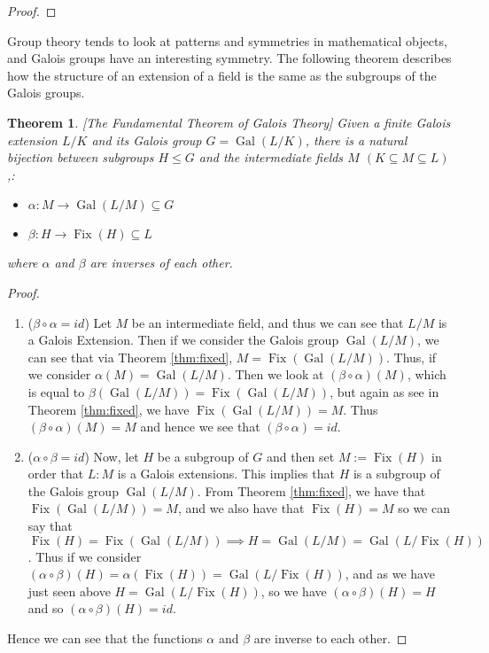 \documentclass[12pt]{article}
\newtheorem{theorem}{Theorem}
\newcommand{\Gal}{\operatorname{Gal}}
\newcommand{\Fix}{\operatorname{Fix}}
\begin{document}
\begin{proof}
    
\end{proof}

Group theory tends to look at patterns and symmetries in mathematical objects, and Galois groups have an interesting symmetry. The following theorem describes how the structure of an extension of a field is the same as the subgroups of the Galois groups.

\begin{theorem} \label{thm:fundamental-theorem} [The Fundamental Theorem of Galois Theory] Given a finite Galois extension $L/K$ and its Galois group $G = \Gal(L/K)$, there is a natural bijection between subgroups $H\leq G$ and the intermediate fields $M$ \hspace{0.05cm} $(K \subseteq M \subseteq L)$,:

\begin{itemize}
    \item $\alpha:M \to \Gal(L/M) \subseteq G$
    \item $\beta:H \to \Fix(H) \subseteq L$
\end{itemize}
where $\alpha$ and $\beta$ are inverses of each other.
\end{theorem}
\begin{proof}
\begin{enumerate}[label=(\roman*)]

 \item ($\beta \circ \alpha = id$) Let $M$ be an intermediate field, and thus we can see that $L/M$ is a Galois Extension. Then if we consider the Galois group $\Gal(L/M)$, we can see that via Theorem \ref{thm:fixed}, $M = \Fix(\Gal(L/M))$. Thus, if we consider $\alpha(M) = \Gal(L/M)$. Then we look at $(\beta \circ \alpha)(M)$, which is equal to $\beta(\Gal(L/M)) = \Fix(\Gal(L/M))$, but again as see in Theorem \ref{thm:fixed}, we have $\Fix(\Gal(L/M)) = M$. Thus $(\beta \circ \alpha)(M) = M$ and hence we see that $(\beta \circ \alpha) = id$.

 \item ($\alpha \circ \beta = id$) Now, let $H$ be a subgroup of $G$ and then set $M :=\Fix(H)$ in order that $L:M$ is a Galois extensions. This implies that $H$ is a subgroup of the Galois group $\Gal(L/M)$. From Theorem \ref{thm:fixed}, we have that $\Fix(\Gal(L/M))=M$, and we also have that $\Fix(H) = M$ so we can say that $\Fix(H)=\Fix(\Gal(L/M)) \implies H = \Gal(L/M) = \Gal(L/\Fix(H))$. Thus if we consider $(\alpha \circ \beta)(H) = \alpha(\Fix(H)) = \Gal(L/\Fix(H))$, and as we have just seen above $H = \Gal(L/\Fix(H))$, so we have $(\alpha \circ \beta)(H) = H$ and so $(\alpha \circ \beta)(H) = id$.
\end{enumerate}
Hence we can see that the functions $\alpha$ and $\beta$ are inverse to each other.
\end{proof}
\end{document}
